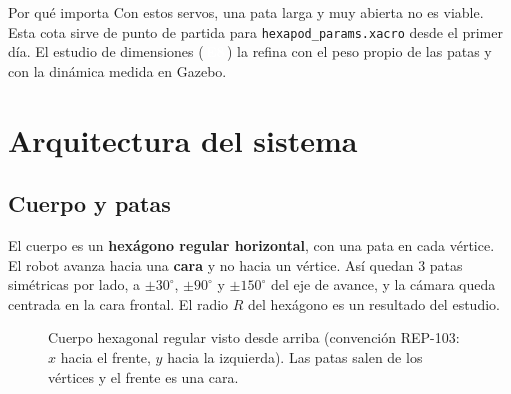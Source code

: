 \documentclass[11pt,a4paper]{article}
\newcommand{\pill}[2]{{\setlength{\fboxsep}{1.6pt}\colorbox{#1}{\textcolor{white}{\footnotesize\bfseries\,#2\,}}}}
\newcommand{\Eo}{\pill{cEstudio}{E8}}
\begin{document}
\begin{destacado}{Por qué importa}
Con estos servos, una pata larga y muy abierta no es viable. Esta cota sirve de punto de partida para \texttt{hexapod\_params.xacro} desde el primer día. El estudio de dimensiones (\Eo) la refina con el peso propio de las patas y con la dinámica medida en Gazebo.
\end{destacado}

\section{Arquitectura del sistema}

\subsection{Cuerpo y patas}

El cuerpo es un \textbf{hexágono regular horizontal}, con una pata en cada vértice. El robot avanza hacia una \textbf{cara} y no hacia un vértice. Así quedan 3 patas simétricas por lado, a $\pm30^\circ$, $\pm90^\circ$ y $\pm150^\circ$ del eje de avance, y la cámara queda centrada en la cara frontal. El radio $R$ del hexágono es un resultado del estudio.

\begin{figure}[H]
\centering
{}
\caption{Cuerpo hexagonal regular visto desde arriba (convención REP-103: $x$ hacia el frente, $y$ hacia la izquierda). Las patas salen de los vértices y el frente es una cara.}
\end{figure}
\end{document}
